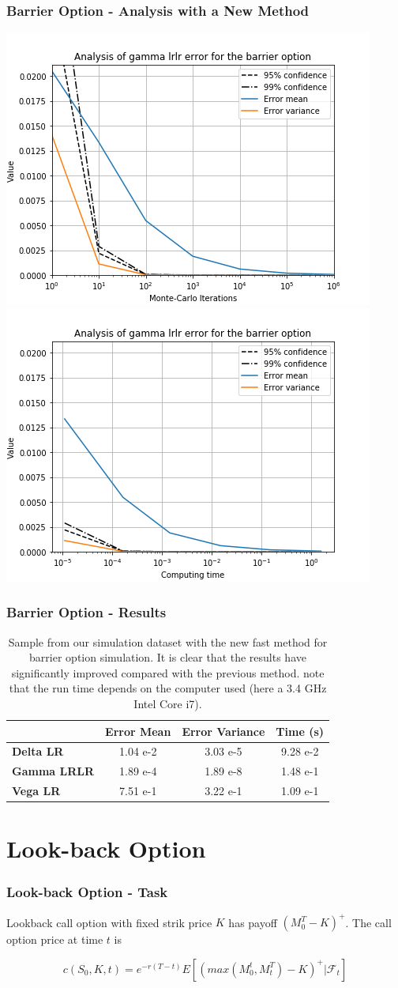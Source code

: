 \documentclass[12pt]{beamer}
\begin{document}
\begin{frame}
\frametitle{Barrier Option - Analysis with a New Method}
\includegraphics[width=.5\textwidth]{graphs/barriergammalrlr.png}
\includegraphics[width=.5\textwidth]{graphs/barriergammalrlrtime.png}
\end{frame}

\begin{frame}
\frametitle{Barrier Option - Results}
\begin{table}
\centering
\begin{tabular}{|l|c|c|c|}
\hline
    & \textbf{Error Mean} & \textbf{Error Variance} & \textbf{Time (s)} \\ \hline
\textbf{Delta LR} & 1.04 e-2 & 3.03 e-5 & 9.28 e-2\\ \hline
\textbf{Gamma LRLR} & 1.89 e-4 & 1.89 e-8& 1.48 e-1\\ \hline
\textbf{Vega LR} & 7.51 e-1 & 3.22 e-1 & 1.09 e-1\\ \hline
\end{tabular}
\caption{Sample from our simulation dataset with the new fast method for barrier option simulation. It is clear that the results have significantly improved compared with the previous method. note that the run time depends on the computer used (here a 3.4 GHz Intel Core i7).}
\end{table}

\end{frame}


\section{Look-back Option}
\frame{\tableofcontents[currentsection]}
\begin{frame}
\frametitle{Look-back Option - Task}
Lookback call option with fixed strik price $K$ has payoff $(M^T_{0}-K)^+$. The call option price at time $t$ is

$$c(S_0,K,t) = e^{-r(T-t)}E[(max(M^t_0,M^T_t)-K)^+|\mathcal{F}_t] $$


\end{frame}
\end{document}
